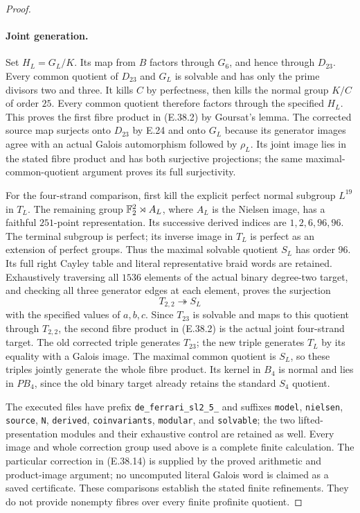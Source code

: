 \begin{proof}
\paragraph{Joint generation.}
Set $H_L=G_L/K$.  Its map from $B$ factors
through $G_6$, and hence through $D_{23}$.
Every common quotient of $D_{23}$ and
$G_L$ is solvable and has only the prime
divisors two and three.  It kills $C$ by
perfectness, then kills the normal group
$K/C$ of order $25$.  Every common quotient
therefore factors through the specified
$H_L$.  This proves the first fibre product
in \textup{(E.38.2)} by Goursat's lemma.
The corrected source map surjects onto
$D_{23}$ by E.24 and onto $G_L$ because
its generator images agree with an actual
Galois automorphism followed by $\rho_L$.
Its joint image lies in the stated fibre
product and has both surjective projections;
the same maximal-common-quotient argument
proves its full surjectivity.

For the four-strand comparison, first kill
the explicit perfect normal subgroup
$L^{19}$ in $T_L$.  The remaining group
$\mathbb F_2^2\rtimes A_L$, where $A_L$ is the
Nielsen image, has a faithful $251$-point
representation.  Its successive derived
indices are $1,2,6,96,96$.  The terminal
subgroup is perfect; its inverse image in
$T_L$ is perfect as an extension of perfect
groups.  Thus the maximal solvable quotient
$S_L$ has order $96$.
Its full right Cayley table and literal
representative braid words are retained.
Exhaustively traversing all $1536$ elements
of the actual binary degree-two target,
and checking all three generator edges
at each element, proves the surjection
\[
                   T_{2,2}\twoheadrightarrow S_L
 \tag{E.38.15}
\]
with the specified values of $a,b,c$.
Since $T_{23}$ is solvable and maps to
this quotient through $T_{2,2}$, the second
fibre product in \textup{(E.38.2)} is the
actual joint four-strand target.  The old
corrected triple generates $T_{23}$; the
new triple generates $T_L$ by its equality
with a Galois image.  The maximal common
quotient is $S_L$, so these triples jointly
generate the whole fibre product.  Its
kernel in $B_4$ is normal and lies in
$PB_4$, since the old binary target
already retains the standard $S_4$ quotient.

The executed files have prefix
\texttt{de\_ferrari\_sl2\_5\_} and suffixes
\texttt{model}, \texttt{nielsen}, \texttt{source},
\texttt{N}, \texttt{derived}, \texttt{coinvariants},
\texttt{modular}, and \texttt{solvable}; the
two lifted-presentation modules and their
exhaustive control are retained as well.
Every image and whole correction group
used above is a complete finite calculation.
The particular correction in
\textup{(E.38.14)} is supplied by the
proved arithmetic and product-image
argument; no uncomputed literal Galois
word is claimed as a saved certificate.
These comparisons establish the stated
finite refinements.  They do not provide
nonempty fibres over every finite
profinite quotient.
\end{proof}
